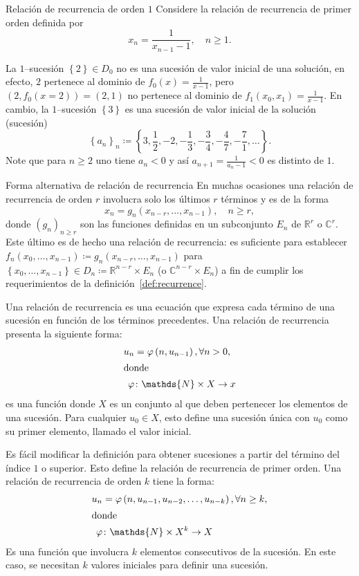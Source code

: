 \begin{example}{Relación de recurrencia de orden $1$}
	Considere la relación de recurrencia de primer orden definida por \[x_{n}=\frac{1}{x_{n-1}-1},\quad n\geq1.\]

	La $1$--sucesión $\left\{2\right\}\in D_{0}$ no es una sucesión de valor inicial de una solución, en efecto, $2$ pertenece al dominio de $f_{0}\left(x\right)=\frac{1}{x-1}$, pero $\left(2,f_{0}(x=2)\right)=\left(2,1\right)$ no pertenece al dominio de $f_{1}\left(x_{0},x_{1}\right)=\frac{1}{x-1}$. En cambio, la $1$--sucesión $\left\{3\right\}$ es una sucesión de valor inicial de la solución (sucesión) \[ \left\{a_{n}\right\}_{n}\coloneqq\left\{3,\frac{1}{2},-2,-\frac{1}{3},-\frac{3}{4},-\frac{4}{7},-\frac{7}{1},\ldots\right\}. \] Note que para $n\geq2$ uno tiene $a_{n}<0$ y así $a_{n+1}=\frac{1}{a_{n}-1}<0$ es distinto de $1$.
\end{example}

\begin{example}{Forma alternativa de relación de recurrencia}
	En muchas ocasiones una relación de recurrencia de orden $r$ involucra solo los últimos $r$ términos y es de la forma	\[ x_{n}=g_{n}\left(x_{n-r},\ldots,x_{n-1}\right),\quad n\geq r, \] donde ${\left(g_{n}\right)}_{n\geq r}$ son las funciones definidas en un subconjunto $E_{n}$ de $\mathds{R}^{r}$ o $\mathds{C}^{r}$. Este último es de hecho una relación de recurrencia: es suficiente para establecer $f_{n}\left(x_{0},\ldots,x_{n-1}\right)\coloneqq g_{n}\left(x_{n-r},\ldots,x_{n-1}\right)$ para $\left\{x_{0},\ldots,x_{n-1}\right\}\in D_{n}\coloneqq\mathds{R}^{n-r}\times E_{n}$ (o $\mathds{C}^{n-r}\times E_{n}$) a fin de cumplir los requerimientos de la definición~\eqref{def:recurrence}.
\end{example}

Una relación de recurrencia es una ecuación que expresa cada término de una sucesión en función de los términos precedentes. Una relación de recurrencia presenta la siguiente forma:
\begin{align*}
u_{n}&=\varphi\left(n,u_{n-1}\right),\forall n>0,\\
\intertext{donde}
\varphi&\colon\mathds{N}\times X\rightarrow x
\end{align*}
es una función donde $X$ es un conjunto al que deben pertenecer los elementos de una sucesión. Para cualquier $u_{0}\in X$, esto define una sucesión única con $u_{0}$ como su primer elemento, llamado el valor inicial.

Es fácil modificar la definición para obtener sucesiones a partir del término del índice $1$ o superior. Esto define la relación de recurrencia de primer orden. Una relación de recurrencia de orden $k$ tiene la forma:
\begin{align*}
u_{n}&=\varphi\left(n,u_{n-1},u_{n-2},\ldots,u_{n-k}\right),\forall n\geq k,\\
\intertext{donde}
\varphi&\colon\mathds{N}\times X^{k}\rightarrow X
\end{align*}
Es una función que involucra $k$ elementos consecutivos de la sucesión. En este caso, se necesitan $k$ valores iniciales para definir una sucesión.

